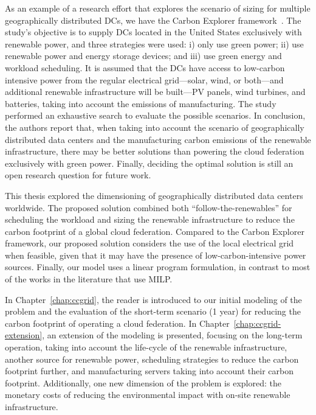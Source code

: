 As an example of a research effort that explores the scenario of sizing for multiple geographically distributed DCs, we have the Carbon Explorer framework~\cite{acun2022holistic}. The study's objective is to supply DCs located in the United States exclusively with renewable power, and three strategies were used: i) only use green power; ii) use renewable power and energy storage devices; and iii) use green energy and workload scheduling. It is assumed that the DCs have access to low-carbon intensive power from the regular electrical grid---solar, wind, or both---and additional renewable infrastructure will be built---PV panels, wind turbines, and batteries, taking into account the emissions of manufacturing. The study performed an exhaustive search to evaluate the possible scenarios. In conclusion, the authors report that, when taking into account the scenario of geographically distributed data centers and the manufacturing carbon emissions of the renewable infrastructure, there may be better solutions than powering the cloud federation exclusively with green power. Finally, deciding the optimal solution is still an open research question for future work.

This thesis explored the dimensioning of geographically distributed data centers worldwide. The proposed solution combined both ``follow-the-renewables'' for scheduling the workload and sizing the renewable infrastructure to reduce the carbon footprint of a global cloud federation. Compared to the Carbon Explorer framework, our proposed solution considers the use of the local electrical grid when feasible, given that it may have the presence of low-carbon-intensive power sources. Finally, our model uses a linear program formulation, in contrast to most of the works in the literature that use MILP.

In Chapter~\ref{chap:ccgrid}, the reader is introduced to our initial modeling of the problem and the evaluation of the short-term scenario (1 year) for reducing the carbon footprint of operating a cloud federation. In Chapter~\ref{chap:ccgrid-extension}, an extension of the modeling is presented, focusing on the long-term operation, taking into account the life-cycle of the renewable infrastructure, another source for renewable power, scheduling strategies to reduce the carbon footprint further, and manufacturing servers taking into account their carbon footprint. Additionally,  one new dimension of the problem is explored: the monetary costs of reducing the environmental impact with on-site renewable infrastructure.


